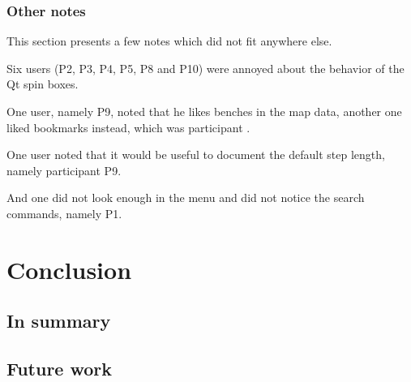 \documentclass[nolof,digital]{fithesis3}
\begin{document}
\subsection{Other notes}
This section presents a few notes which did not fit anywhere else.

Six users (P2, P3, P4, P5, P8 and P10) were annoyed about the behavior of the Qt spin boxes.

One user, namely P9, noted that he likes benches in the map data, another one liked bookmarks instead, which was participant .

One user noted that it would be useful to document the default step length, namely participant P9.

And one did not look enough in the menu and did not notice the search commands, namely P1.
\chapter{Conclusion}
\section{In summary}
\section{Future work}
\end{document}
